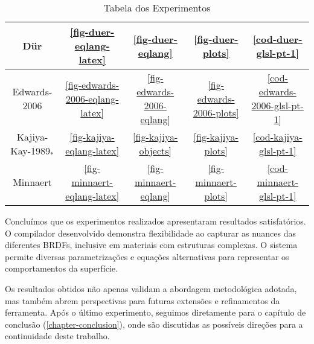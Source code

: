 \begin{table}[h!]
\begin{tabular}{|c|c|c|c|c|}
    Dür                  & \autoref{fig-duer-eqlang-latex}                                  & \autoref{fig-duer-eqlang}                                 & \autoref{fig-duer-plots}                                 &                      \autoref{cod-duer-glsl-pt-1}              \\ \hline
    Edwards-2006         & \autoref{fig-edwards-2006-eqlang-latex}                          & \autoref{fig-edwards-2006-eqlang}                         & \autoref{fig-edwards-2006-plots}                         &              \autoref{cod-edwards-2006-glsl-pt-1}              \\ \hline
    Kajiya-Kay-1989$_*$  & \autoref{fig-kajiya-eqlang-latex}                                & \autoref{fig-kajiya-objects}                              & \autoref{fig-kajiya-plots}                               &                  \autoref{cod-kajiya-glsl-pt-1}              \\ \hline
    Minnaert             & \autoref{fig-minnaert-eqlang-latex}                              & \autoref{fig-minnaert-eqlang}                             & \autoref{fig-minnaert-plots}                             &                  \autoref{cod-minnaert-glsl-pt-1}              \\ \hline
\end{tabular}
\caption{Tabela dos Experimentos}
\label{table-experiments}
\end{table}


Concluímos que os experimentos realizados apresentaram resultados satisfatórios. O compilador desenvolvido demonstra flexibilidade ao capturar as nuances das diferentes BRDFs, inclusive em materiais com estruturas complexas. O sistema permite diversas parametrizações e equações alternativas para representar os comportamentos da superfície.

Os resultados obtidos não apenas validam a abordagem metodológica adotada, mas também abrem perspectivas para futuras extensões e refinamentos da ferramenta. Após o último experimento, seguimos diretamente para o capítulo de conclusão (\autoref{chapter-conclusion}), onde são discutidas as possíveis direções para a continuidade deste trabalho.


